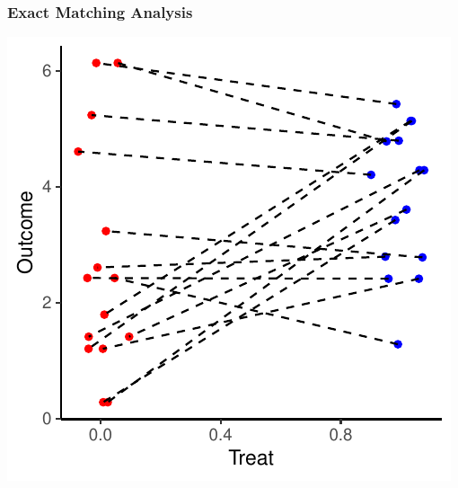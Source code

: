 \documentclass[xcolor=x11names,compress]{beamer}\usepackage[]{graphicx}\usepackage[]{color}
\makeatletter
\def\maxwidth{ %
  \ifdim\Gin@nat@width>\linewidth
    \linewidth
  \else
    \Gin@nat@width
  \fi
}
\newenvironment{knitrout}{}{} %
\renewcommand{\(}{\begin{columns}}
\renewcommand{\)}{\end{columns}}
\newcommand{\<}[1]{\begin{column}{#1}}
\renewcommand{\>}{\end{column}}
\makeatother
\begin{document}
\begin{frame}
\frametitle{Exact Matching Analysis}
\begin{center}
\begin{knitrout}
\color{fgcolor}
\includegraphics[width=\maxwidth]{figure/exact_matching_analysis1b-1} 

\end{knitrout}
\end{center}
\end{frame}
\end{document}
